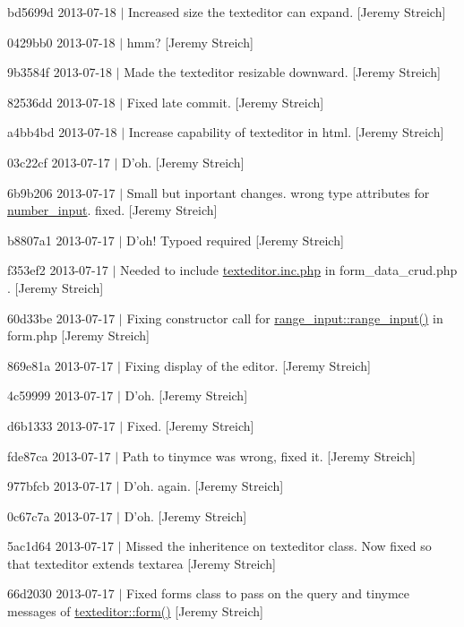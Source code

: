 \begin{DoxyItemize}
\item bd5699d 2013-\/07-\/18 $|$ Increased size the texteditor can expand. \mbox{[}Jeremy Streich\mbox{]}
\item 0429bb0 2013-\/07-\/18 $|$ hmm? \mbox{[}Jeremy Streich\mbox{]}
\item 9b3584f 2013-\/07-\/18 $|$ Made the texteditor resizable downward. \mbox{[}Jeremy Streich\mbox{]}
\item 82536dd 2013-\/07-\/18 $|$ Fixed late commit. \mbox{[}Jeremy Streich\mbox{]}
\item a4bb4bd 2013-\/07-\/18 $|$ Increase capability of texteditor in html. \mbox{[}Jeremy Streich\mbox{]}
\item 03c22cf 2013-\/07-\/17 $|$ D'oh. \mbox{[}Jeremy Streich\mbox{]}
\item 6b9b206 2013-\/07-\/17 $|$ Small but inportant changes. wrong type attributes for \hyperlink{classnumber__input}{number\-\_\-input}. fixed. \mbox{[}Jeremy Streich\mbox{]}
\item b8807a1 2013-\/07-\/17 $|$ D'oh! Typoed required \mbox{[}Jeremy Streich\mbox{]}
\item f353ef2 2013-\/07-\/17 $|$ Needed to include \hyperlink{texteditor_8inc_8php}{texteditor.\-inc.\-php} in form\-\_\-data\-\_\-crud.\-php . \mbox{[}Jeremy Streich\mbox{]}
\item 60d33be 2013-\/07-\/17 $|$ Fixing constructor call for \hyperlink{classrange__input_a6038a3b2b1499abb08ff6a10ac7a8e81}{range\-\_\-input\-::range\-\_\-input()} in form.\-php \mbox{[}Jeremy Streich\mbox{]}
\item 869e81a 2013-\/07-\/17 $|$ Fixing display of the editor. \mbox{[}Jeremy Streich\mbox{]}
\item 4c59999 2013-\/07-\/17 $|$ D'oh. \mbox{[}Jeremy Streich\mbox{]}
\item d6b1333 2013-\/07-\/17 $|$ Fixed. \mbox{[}Jeremy Streich\mbox{]}
\item fde87ca 2013-\/07-\/17 $|$ Path to tinymce was wrong, fixed it. \mbox{[}Jeremy Streich\mbox{]}
\item 977bfcb 2013-\/07-\/17 $|$ D'oh. again. \mbox{[}Jeremy Streich\mbox{]}
\item 0c67c7a 2013-\/07-\/17 $|$ D'oh. \mbox{[}Jeremy Streich\mbox{]}
\item 5ac1d64 2013-\/07-\/17 $|$ Missed the inheritence on texteditor class. Now fixed so that texteditor extends textarea \mbox{[}Jeremy Streich\mbox{]}
\item 66d2030 2013-\/07-\/17 $|$ Fixed forms class to pass on the query and tinymce messages of \hyperlink{classtexteditor_a129b929db008ec11f4a683f542787c74}{texteditor\-::form()} \mbox{[}Jeremy Streich\mbox{]}

\end{DoxyItemize}

